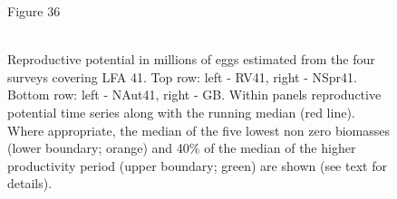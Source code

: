 \documentclass[11pt]{article}
\newcommand{\e}{/backup/bio_data/bio.lobster/figures/} %
\begin{document}
\begin{landscape}
\begin{figure}

\centering
   
       {Figure 36}\\
       \\

    
\caption{Reproductive potential in millions of eggs estimated from the four surveys covering LFA 41. Top row: left - RV41, right - NSpr41. Bottom row: left - NAut41, right - GB. Within panels reproductive potential time series along with the running median (red line). Where appropriate, the median of the five lowest non zero biomasses (lower boundary; orange) and  40\% of the median of the higher productivity period (upper boundary; green) are shown (see text for details). }
\end{figure}
\end{landscape}
\end{document}
